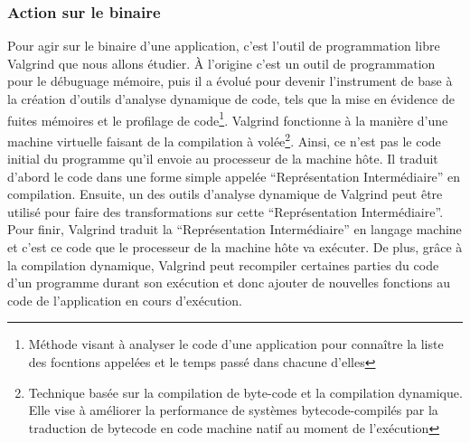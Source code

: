 \subsubsection{Action sur le binaire}
Pour agir sur le binaire d'une application, c'est l'outil de programmation libre
Valgrind\cite{INTERCEPTION:Valgrind, INTERCEPTION:Valgrind_web} que nous allons
étudier. À l'origine c'est un outil de programmation pour le débuguage mémoire,
puis il a évolué pour devenir l'instrument de base à la création d'outils
d'analyse dynamique de code, tels que la mise en évidence de fuites mémoires et
le profilage de code\footnote{Méthode visant à analyser le code d'une
  application pour connaître la liste des focntions appelées et le temps passé
  dans chacune d'elles}. Valgrind fonctionne à la manière d'une machine
virtuelle faisant de la compilation à volée\footnote{Technique basée sur la
  compilation de byte-code et la compilation dynamique. Elle vise à améliorer la
  performance de systèmes bytecode-compilés par la traduction de bytecode en
  code machine natif au moment de l'exécution}. Ainsi, ce n'est pas le code
initial du programme qu'il envoie au processeur de la machine hôte. Il traduit
d'abord le code dans une forme simple appelée ``Représentation Intermédiaire''
en compilation. Ensuite, un des outils d'analyse dynamique de Valgrind peut être
utilisé pour faire des transformations sur cette ``Représentation
Intermédiaire''. Pour finir, Valgrind traduit la ``Représentation
Intermédiaire'' en langage machine et c'est ce code que le processeur de la
machine hôte va exécuter. De plus, grâce à la compilation dynamique, Valgrind
peut recompiler certaines parties du code d'un programme durant son exécution et
donc ajouter de nouvelles fonctions au code de l'application en cours
d'exécution.


